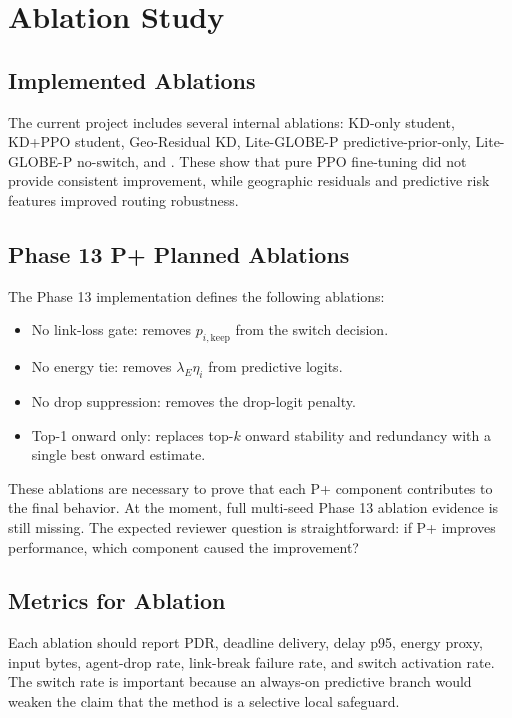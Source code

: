 \section{Ablation Study}
\label{sec:ablation}

\subsection{Implemented Ablations}
The current project includes several internal ablations: KD-only student, KD+PPO student, Geo-Residual KD, Lite-GLOBE-P predictive-prior-only, Lite-GLOBE-P no-switch, and \phaseTwelve. These show that pure PPO fine-tuning did not provide consistent improvement, while geographic residuals and predictive risk features improved routing robustness.

\subsection{Phase 13 P+ Planned Ablations}
The Phase 13 implementation defines the following ablations:
\begin{itemize}
    \item No link-loss gate: removes $p_{i,\mathrm{keep}}$ from the switch decision.
    \item No energy tie: removes $\lambda_E\eta_i$ from predictive logits.
    \item No drop suppression: removes the drop-logit penalty.
    \item Top-1 onward only: replaces top-$k$ onward stability and redundancy with a single best onward estimate.
\end{itemize}

These ablations are necessary to prove that each P+ component contributes to the final behavior. At the moment, full multi-seed Phase 13 ablation evidence is still missing. The expected reviewer question is straightforward: if P+ improves performance, which component caused the improvement?

\subsection{Metrics for Ablation}
Each ablation should report PDR, deadline delivery, delay p95, energy proxy, input bytes, agent-drop rate, link-break failure rate, and switch activation rate. The switch rate is important because an always-on predictive branch would weaken the claim that the method is a selective local safeguard.
